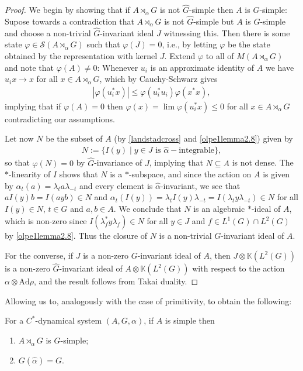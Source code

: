 \begin{proof}
	We begin by showing that if $A\rtimes_\alpha G$ is not $\hat G$-simple then $A$ is $G$-simple: Supose towards a contradiction that $A \rtimes_\alpha G$ is not $\hat G$-simple but $A$ is $G$-simple and choose a non-trivial $\hat G$-invariant ideal $J$ witnessing this. Then there is some state $\varphi \in \mathcal{S}(A \rtimes_\alpha G)$ such that $\varphi(J) = 0$, i.e., by letting $\varphi$ be the state obtained by the representation with kernel $J$. Extend $\varphi$ to all of $M(A \rtimes_\alpha G)$ and note that $\varphi(A) \neq 0$: Whenever $u_i$ is an approximate identity of $A$ we have $u_i x \to x$ for all $x \in A \rtimes_\alpha G$, which by Cauchy-Schwarz gives
	\begin{align*}
	|\varphi(u_i^* x)| \leq \varphi(u_i^*u_i)\varphi(x^*x),
	\end{align*}
	implying that if $\varphi(A) = 0$ then $\varphi(x) = \lim \varphi(u_i^* x) \leq 0$ for all $x \in A \rtimes_\alpha G$ contradicting our assumptions.
	
	Let now $N$ be the subset of $A$ (by \cref{landstadcross} and \cref{olpe1lemma2.8}) given by
	\begin{align*}
		N:=\{ I(y) \mid y \in J \text{ is } \hat \alpha-\text{integrable}\},
	\end{align*}
	so that $\varphi(N) = 0$ by $\hat G$-invariance of $J$, implying that $N \subseteq A$ is not dense. The $*$-linearity of $I$ shows that $N$ is a $*$-subspace, and since the action on $A$ is given by $\alpha_t(a) = \lambda_t a \lambda_{-t}$ and every element is $\hat \alpha$-invariant, we see that $a I(y) b = I(ayb) \in N$ and $\alpha_t(I(y)) = \lambda_t I(y) \lambda_{-t} = I(\lambda_t y \lambda_{-t}) \in N$ for all $I(y)\in N$, $t \in G$ and $a,b \in A$. We conclude that $N$ is an algebraic $*$-ideal of $A$, which is non-zero since $I(\lambda_f^* y \lambda_f) \in N$ for all $y \in J$ and $f \in L^1(G) \cap L^2(G)$ by \cref{olpe1lemma2.8}. Thus the closure of $N$ is a non-trivial $G$-invariant ideal of $A$.

	For the converse, if $J$ is a non-zero $G$-invariant ideal of $A$, then $J \otimes \mathbb{K}(L^2(G))$ is a non-zero $\hat G$-invariant ideal of $A \otimes \mathbb{K}(L^2(G))$ with respect to the action $\alpha \otimes \mathrm{Ad} \rho$, and the result follows from Takai duality.
\end{proof}
Allowing us to, analogously with the case of primitivity, to obtain the following:
\begin{proposition}	
	For a $C^*$-dynamical system $(A,G,\alpha)$, if $A$ is simple then
\begin{enumerate}
	\item $A \rtimes_\alpha G$ is $\hat G$-simple;
	\item $G(\hat \alpha) = G$.
\end{enumerate}
\end{proposition}
